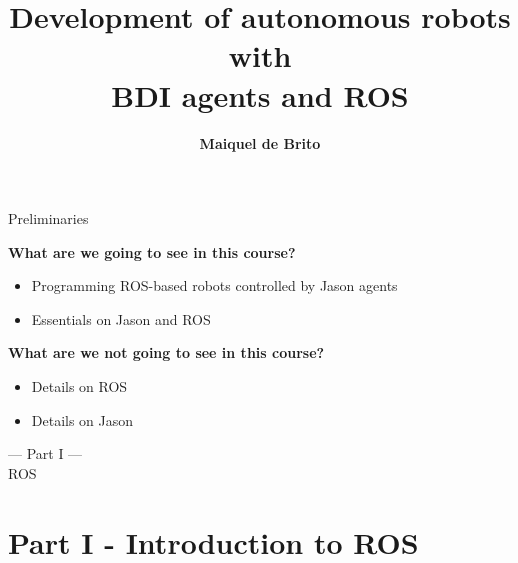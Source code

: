 \documentclass[compress]{beamer}
\title[]{Development of autonomous robots with \\ BDI agents and ROS
}
\author[]{{\bf Maiquel de Brito}}
\institute{%
\begin{minipage}[t]{.3\linewidth}\centering
\inst{1}UFSC-Blumenau-Brasil\\
\texttt{maiquel.b@ufsc.br}
\end{minipage}

}
\date{
\begin{columns}
 \column{.2\textwidth}
 \column{.6\textwidth}
 \begin{center}
 \end{center}
 \column{.2\textwidth}
 
\end{columns}

}
\newcommand{\link}[2]{\href{#1}{\underline{\textcolor{blue}{#2}}}}
\begin{document}
\begin{frame}[plain]
  \titlepage
\end{frame}



\begin{frame}{Preliminaries}
 
    {\bf What are we going to see in this course?}
    \begin{itemize}\scriptsize
        \item Programming ROS-based robots controlled by Jason agents
        \item Essentials on Jason and ROS
    \end{itemize}
    
    
    \vspace{1cm}
    
    {\bf What are we not going to see in this course?}
    \begin{itemize}\scriptsize
     \item Details on ROS
     \item Details on Jason
    \end{itemize}

    
%     

 
 
\end{frame}

\begin{frame}
 

 \HUGE
\centering
--- Part I ---\\
ROS 
 
\end{frame}



\section{Part I - Introduction to ROS}
\end{document}
